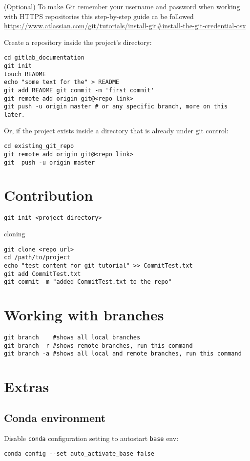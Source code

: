 \documentclass[11pt]{article}
\newcommand{\nextdiv}{\vspace{2mm}\noindent}
\begin{document}
\nextdiv
(Optional) To make Git remember your username and password when working with HTTPS repositories this step-by-step guide ca be followed \url{https://www.atlassian.com/git/tutorials/install-git#install-the-git-credential-osx}


\nextdiv
Create a repository inside the project's directory:

\begin{lstlisting}
cd gitlab_documentation
git init
touch README
echo "some text for the" > README 
git add README git commit -m 'first commit'  
git remote add origin git@<repo link>  
git push -u origin master # or any specific branch, more on this later.
\end{lstlisting}

\nextdiv
Or, if the project exists inside a directory that is already under git control:

\begin{lstlisting}
cd existing_git_repo
git remote add origin git@<repo link>
git  push -u origin master
\end{lstlisting}

\section*{Contribution}
\begin{lstlisting}
git init <project directory>
\end{lstlisting}

cloning

\begin{lstlisting}
git clone <repo url>
cd /path/to/project 
echo "test content for git tutorial" >> CommitTest.txt 
git add CommitTest.txt 
git commit -m "added CommitTest.txt to the repo"
\end{lstlisting}


\section*{Working with branches}
\begin{lstlisting}
git branch    #shows all local branches
git branch -r #shows remote branches, run this command
git branch -a #shows all local and remote branches, run this command
\end{lstlisting}

\section*{Extras}

\subsection*{Conda environment}

Disable \texttt{conda} configuration setting to autostart \texttt{base} env:
\begin{lstlisting}
conda config --set auto_activate_base false
\end{lstlisting}
\end{document}

